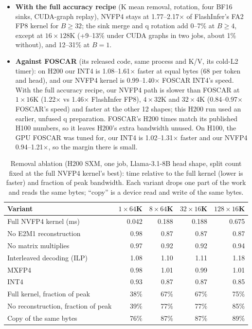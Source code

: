 \documentclass[11pt]{article}
\begin{document}
\begin{itemize}
  \item \textbf{With the full accuracy recipe} (K mean removal, rotation, four BF16 sinks, CUDA-graph replay), NVFP4 stays at 1.77--2.17$\times$ of FlashInfer's FA2 FP8 kernel for $B \geq 32$; the sink merge and q rotation add 0--7\% at $B \geq 4$, except at $16 \times 128$K (+9--13\% under CUDA graphs in two jobs, about 1\% without), and 12--31\% at $B = 1$.
  \item \textbf{Against FOSCAR} (its released code, same process and K/V, its cold-L2 timer): on H200 our INT4 is 1.08--1.61$\times$ faster at equal bytes (68 per token and head), and our NVFP4 kernel is 0.99--1.40$\times$ FOSCAR INT4's speed. With the full accuracy recipe, our NVFP4 path is slower than FOSCAR at $1 \times 16$K (1.22$\times$ vs 1.46$\times$ FlashInfer FP8), $4 \times 32$K and $32 \times 4$K (0.84--0.97$\times$ FOSCAR's speed) and faster at the other 12 shapes; this H200 run used an earlier, unfused q preparation. FOSCAR's H200 times match its published H100 numbers, so it leaves H200's extra bandwidth unused. On H100, the GPU FOSCAR was tuned for, our INT4 is 1.02--1.31$\times$ faster and our NVFP4 0.94--1.21$\times$, so the margin there is small.
\end{itemize}

\begin{table}[tbp]
\centering
\caption{Removal ablation (H200 SXM, one job, Llama-3.1-8B head shape, split count fixed at the full NVFP4 kernel's best): time relative to the full kernel (lower is faster) and fraction of peak bandwidth. Each variant drops one part of the work and reads the same bytes; ``copy'' is a device read and write of the same bytes.}
\label{tab:ablation}
\small
\begin{tabular}{@{}lrrrr@{}}
\toprule
Variant & $1 \times 64$K & $8 \times 64$K & $32 \times 16$K & $128 \times 16$K \\
\midrule
Full NVFP4 kernel (ms)            & 0.042 & 0.188 & 0.188 & 0.675 \\
No E2M1 reconstruction            & 0.98 & 0.87 & 0.87 & 0.87 \\
No matrix multiplies              & 0.97 & 0.92 & 0.92 & 0.94 \\
Interleaved decoding (ILP)        & 1.08 & 1.10 & 1.11 & 1.18 \\
MXFP4                             & 0.98 & 1.01 & 0.99 & 1.01 \\
INT4                              & 0.93 & 0.87 & 0.87 & 0.85 \\
\midrule
Full kernel, fraction of peak     & 38\% & 67\% & 67\% & 75\% \\
No reconstruction, fraction of peak & 39\% & 77\% & 77\% & 85\% \\
Copy of the same bytes            & 76\% & 87\% & 87\% & 89\% \\
\bottomrule
\end{tabular}
\end{table}
\end{document}
